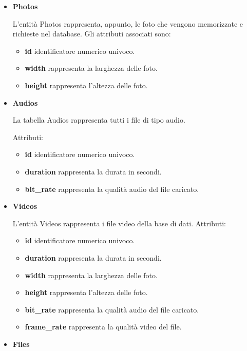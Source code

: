 \pagebreak

\begin{itemize}
	\item \textbf{Photos}
	
		L'entità Photos rappresenta, appunto, le foto che vengono memorizzate e richieste nel database. Gli attributi associati sono:
		
		\begin{itemize}
			\item \textbf{id} identificatore numerico univoco.
			\item \textbf{width} rappresenta la larghezza delle foto.
			\item \textbf{height} rappresenta l'altezza delle foto.
		\end{itemize}
	
	\item \textbf{Audios}
	
		La tabella Audios rappresenta tutti i file di tipo audio. 
		
		Attributi:
		
		\begin{itemize}
			\item \textbf{id} identificatore numerico univoco.
			\item \textbf{duration} rappresenta la durata in secondi.
			\item \textbf{bit\_rate} rappresenta la qualità audio del file caricato.
		\end{itemize}
		
	\item \textbf{Videos}
	
		L'entità Videos rappresenta i file video della base di dati.
		Attributi:
		
		\begin{itemize}
			\item \textbf{id} identificatore numerico univoco.
			\item \textbf{duration} rappresenta la durata in secondi.
			\item \textbf{width} rappresenta la larghezza delle foto.
			\item \textbf{height} rappresenta l'altezza delle foto.
			\item \textbf{bit\_rate} rappresenta la qualità audio del file caricato.
			\item \textbf{frame\_rate} rappresenta la qualità video del file.
		\end{itemize}
	
	\item \textbf{Files}
		

\end{itemize}
